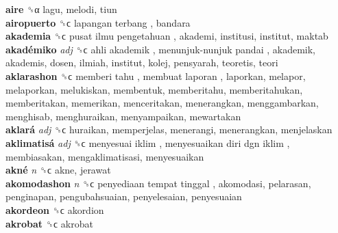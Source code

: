 \textbf{aire} ␝α  lagu, melodi, tiun  \\
\textbf{airopuerto} ␝ϲ   lapangan terbang , bandara  \\
\textbf{akademia} ␝ϲ   pusat ilmu pengetahuan , akademi, institusi, institut, maktab  \\
\textbf{akadémiko} \emph{adj}  ␝ϲ   ahli akademik ,  menunjuk-nunjuk pandai , akademik, akademis, dosen, ilmiah, institut, kolej, pensyarah, teoretis, teori  \\
\textbf{aklarashon} ␝ϲ   memberi tahu ,  membuat laporan , laporkan, melapor, melaporkan, melukiskan, membentuk, memberitahu, memberitahukan, memberitakan, memerikan, menceritakan, menerangkan, menggambarkan, menghisab, menghuraikan, menyampaikan, mewartakan  \\
\textbf{aklará} \emph{adj}  ␝ϲ  huraikan, memperjelas, menerangi, menerangkan, menjelaskan  \\
\textbf{aklimatisá} \emph{adj}  ␝ϲ   menyesuai iklim ,  menyesuaikan diri dgn iklim , membiasakan, mengaklimatisasi, menyesuaikan  \\
\textbf{akné} \emph{n}  ␝ϲ  akne, jerawat  \\
\textbf{akomodashon} \emph{n}  ␝ϲ   penyediaan tempat tinggal , akomodasi, pelarasan, penginapan, pengubahsuaian, penyelesaian, penyesuaian  \\
\textbf{akordeon} ␝ϲ  akordion  \\
\textbf{akrobat} ␝ϲ  akrobat  \\
